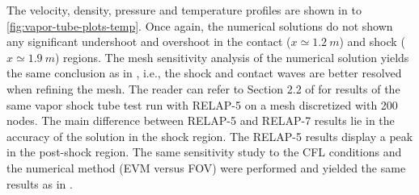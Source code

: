 \documentclass{inputs/mc2015}
\begin{document}
%
The velocity, density, pressure and temperature profiles are shown in  to \ref{fig:vapor-tube-plots-temp}. Once again, the numerical solutions do not shown any significant undershoot and overshoot in the contact ($x \simeq 1.2 \ m$) and shock ($x \simeq 1.9 \ m$) regions. The mesh sensitivity analysis of the numerical solution yields the same conclusion as in , i.e., the shock and contact waves are better resolved when refining the mesh. The reader can refer to Section 2.2 of \cite{Sokolowski-Koszela} for results of the same vapor shock tube test run with RELAP-5 on a mesh discretized with 200 nodes. The main difference between RELAP-5 and RELAP-7 results lie in the accuracy of the solution in the shock region. The RELAP-5 results display a peak in the post-shock region. The same sensitivity study to the CFL conditions and the numerical method (EVM versus FOV) were performed and yielded the same results as in .
%
\end{document}
